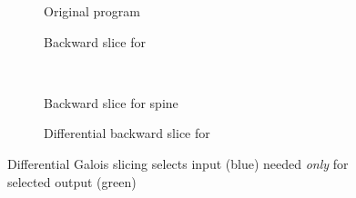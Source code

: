 \begin{figure}
   \small
   \begin{centering}
      \begin{subfigure}{0.45\textwidth}
         {}
      \caption{Original program}
      \label{fig:example:diff-slicing:original}
      \end{subfigure}
      \begin{subfigure}{0.45\textwidth}
         {}
      \caption{Backward slice for }
      \label{fig:example:diff-slicing:subtree}
      \end{subfigure}
      \\
      \begin{subfigure}{0.45\textwidth}
         {}
      \caption{Backward slice for spine \kw{($\hole$, $\hole$)}}
      \label{fig:example:diff-slicing:spine}
      \end{subfigure}
      \begin{subfigure}{0.45\textwidth}
         {}
      \caption{Differential backward slice for }
      \label{fig:example:diff-slicing:differential}
      \end{subfigure}
   \end{centering}
   \vspace{-2mm}
   \caption{Differential Galois slicing selects input (blue) needed \emph{only} for selected output (green)}
   \label{fig:example:diff-slicing}
\end{figure}
